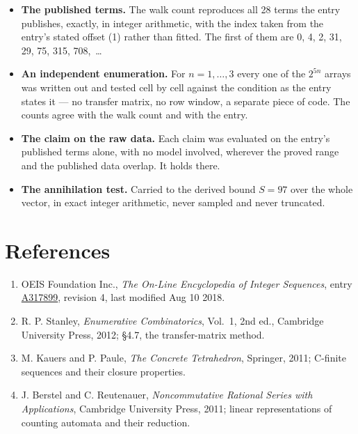 \documentclass[11pt]{article}
\theoremstyle{definition}
\begin{document}
\begin{itemize}

\item {\bfseries The published terms.} The walk count reproduces all 28 terms the entry publishes, exactly, in integer arithmetic, with the index taken from the entry's stated offset (1) rather than fitted. The first of them are 0, 4, 2, 31, 29, 75, 315, 708,~\dots

\item {\bfseries An independent enumeration.} For $n = 1,\dots,3$ every one of the $2^{5n}$ arrays was written out and tested cell by cell against the condition as the entry states it --- no transfer matrix, no row window, a separate piece of code. The counts agree with the walk count and with the entry.

\item {\bfseries The claim on the raw data.} Each claim was evaluated on the entry's published terms alone, with no model involved, wherever the proved range and the published data overlap. It holds there.

\item {\bfseries The annihilation test.} Carried to the derived bound $S = 97$ over the whole vector, in exact integer arithmetic, never sampled and never truncated.

\end{itemize}

\section{References}

\begin{enumerate}

\item OEIS Foundation Inc., \emph{The On-Line Encyclopedia of Integer Sequences}, entry \href{https://oeis.org/A317899}{A317899}, revision 4, last modified Aug 10 2018.

\item R. P. Stanley, \emph{Enumerative Combinatorics}, Vol.~1, 2nd ed., Cambridge University Press, 2012; \S4.7, the transfer-matrix method.

\item M. Kauers and P. Paule, \emph{The Concrete Tetrahedron}, Springer, 2011; C-finite sequences and their closure properties.

\item J. Berstel and C. Reutenauer, \emph{Noncommutative Rational Series with Applications}, Cambridge University Press, 2011; linear representations of counting automata and their reduction.

\end{enumerate}
\end{document}

